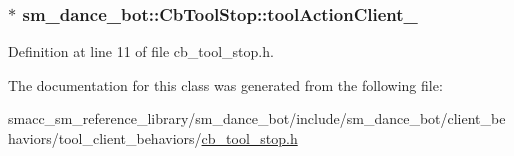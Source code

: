 \subsubsection[{\texorpdfstring{tool\+Action\+Client\+\_\+}{toolActionClient_}}]{$\ast$ sm\+\_\+dance\+\_\+bot\+::\+Cb\+Tool\+Stop\+::tool\+Action\+Client\+\_\+}\hypertarget{classsm__dance__bot_1_1CbToolStop_aa8d9400ae702c970f970980e5d7a13c5}{}\label{classsm__dance__bot_1_1CbToolStop_aa8d9400ae702c970f970980e5d7a13c5}


Definition at line 11 of file cb\+\_\+tool\+\_\+stop.\+h.



The documentation for this class was generated from the following file\+:\begin{DoxyCompactItemize}
\item 
smacc\+\_\+sm\+\_\+reference\+\_\+library/sm\+\_\+dance\+\_\+bot/include/sm\+\_\+dance\+\_\+bot/client\+\_\+behaviors/tool\+\_\+client\+\_\+behaviors/\hyperlink{cb__tool__stop_8h}{cb\+\_\+tool\+\_\+stop.\+h}\end{DoxyCompactItemize}
